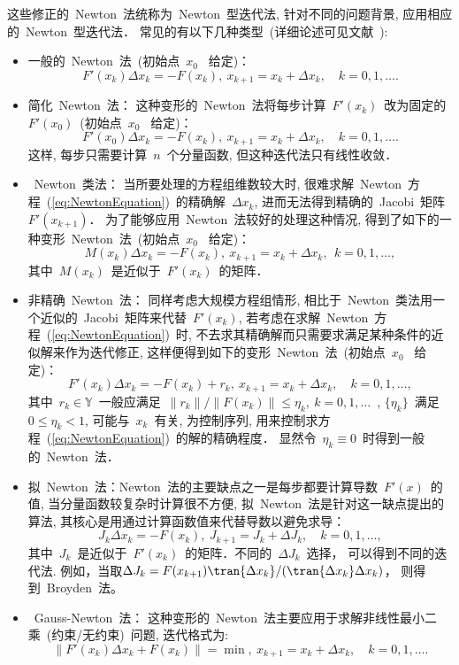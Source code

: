 这些修正的~Newton~法统称为~Newton~型迭代法, 针对不同的问题背景,
应用相应的~Newton~型迭代法．
常见的有以下几种类型~(详细论述可见文献~\cite{Ortega1970,Traub1982,Deuflhard2004}):
\begin{itemize}
\item
一般的~Newton~法~(初始点~$x_0$~ 给定)：
$$
F'(x_k) \Delta x_k = -F(x_k),\ x_{k+1} = x_k + \Delta x_k, \quad k =
0,1,\ldots.
$$
\item
简化~Newton~法：
这种变形的~Newton~法将每步计算~$F'(x_k)$~改为固定的~$F'(x_0)$~(初始点~$x_0$~
给定)：
$$
F'(x_0) \Delta x_k = -F(x_k),\ x_{k+1} = x_k + \Delta x_k,\quad k =
0,1,\ldots.
$$
这样, 每步只需要计算~$n$~个分量函数, 但这种迭代法只有线性收敛．
\item
~Newton~类法： 当所要处理的方程组维数较大时,
很难求解~Newton~方程~(\ref{eq:NewtonEquation})~的精确解~$\Delta
x_k$, 进而无法得到精确的~Jacobi~矩阵~$F'(x_{k+1})$．
为了能够应用~Newton~法较好的处理这种情况,
得到了如下的一种变形~Newton~法~(初始点~$x_0$~ 给定)：
\begin{equation}
\label{it:NML_general} M(x_k)\Delta x_k = -F(x_k),\ x_{k+1} = x_k +
\Delta x_k,\ \ k = 0,1,\ldots,
\end{equation}
其中~$M(x_k)$~是近似于~$F'(x_k)$~的矩阵．
\item
非精确~Newton~法： 同样考虑大规模方程组情形,
相比于~Newton~类法用一个近似的~Jacobi~矩阵来代替~$ F'(x_k)$,
若考虑在求解~Newton~方程~(\ref{eq:NewtonEquation})~时,
不去求其精确解而只需要求满足某种条件的近似解来作为迭代修正,
这样便得到如下的变形~Newton~法~(初始点~$x_0$~ 给定)：
\begin{equation}
\label{it:INM_BanachSpace} F'(x_k) \Delta x_k = -F(x_k) + r_k,\
x_{k+1} = x_k + \Delta x_k,\quad k = 0,1,\ldots,
\end{equation}
其中~$r_k \in \mathbb{Y}$~一般应满足~$\|r_k\|/\|F(x_k)\|\leqslant
\eta_k,\ k= 0,1,\ldots$~, $\{\eta_k\}$~满足~$0\leqslant \eta_k <1$,
可能与~$x_k$~有关, 为控制序列,
用来控制求方程~(\ref{eq:NewtonEquation})~的解的精确程度．
显然令~$\eta_k \equiv 0$~时得到一般的~Newton~法．
\item
拟~Newton~法：Newton~法的主要缺点之一是每步都要计算导数~$F'(x)$~的值,
当分量函数较复杂时计算很不方便,
拟~Newton~法是针对这一缺点提出的算法,
其核心是用通过计算函数值来代替导数以避免求导：
$$
J_k \Delta x_k = -F(x_k), \ J_{k+1} = J_k + \Delta J_k,\quad k =
0,1,\ldots,
$$
其中~$J_k$~是近似于~$F'(x_k)$~的矩阵．不同的~$\Delta J_k$~选择，
可以得到不同的迭代法. 例如，当取$\Delta J_k = F(x_{k+1})\tran{\Delta
x_k}/(\tran{\Delta x_k}\Delta x_k)$， 则得到~Broyden~法。
\item
~Gauss-Newton~法：
这种变形的~Newton~法主要应用于求解非线性最小二乘~(约束/无约束)~问题,
迭代格式为:
\begin{equation}
\label{it:GNM_BanachSpace} \|F'(x_k)\Delta x_k + F(x_k)\| = \min,\
x_{k+1} = x_k + \Delta x_k,\quad k = 0,1,\ldots.
\end{equation}
\end{itemize}


